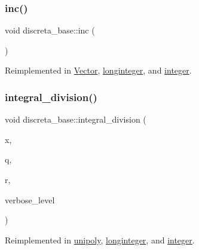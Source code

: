 \mbox{\label{classdiscreta__base_afda42789f4ba04ba399623a6b9e206e3}} 
\subsubsection{\texorpdfstring{inc()}{inc()}}
{\footnotesize\ttfamily void discreta\+\_\+base\+::inc (\begin{DoxyParamCaption}{ }\end{DoxyParamCaption})\hspace{0.3cm}{\ttfamily [virtual]}}



Reimplemented in \mbox{\hyperlink{class_vector_a5f6fe0531bc3d9829becd8503e4156a3}{Vector}}, \mbox{\hyperlink{classlonginteger_aac69c9779c9fed275a1cbae4314438e5}{longinteger}}, and \mbox{\hyperlink{classinteger_a2fd161f380ea688219131ba9a8429509}{integer}}.

\mbox{\label{classdiscreta__base_a92b3001ac35af9185b316c0d8f89070e}} 
\subsubsection{\texorpdfstring{integral\+\_\+division()}{integral\_division()}}
{\footnotesize\ttfamily void discreta\+\_\+base\+::integral\+\_\+division (\begin{DoxyParamCaption}\item[{\mbox{\hyperlink{classdiscreta__base}{discreta\+\_\+base}} \&}]{x,  }\item[{\mbox{\hyperlink{classdiscreta__base}{discreta\+\_\+base}} \&}]{q,  }\item[{\mbox{\hyperlink{classdiscreta__base}{discreta\+\_\+base}} \&}]{r,  }\item[{\mbox{\hyperlink{galois_8h_a09fddde158a3a20bd2dcadb609de11dc}{I\+NT}}}]{verbose\+\_\+level }\end{DoxyParamCaption})\hspace{0.3cm}{\ttfamily [virtual]}}



Reimplemented in \mbox{\hyperlink{classunipoly_aeb794e4d6b10709ed6be7dae9826d705}{unipoly}}, \mbox{\hyperlink{classlonginteger_a692f761cfc91770ca40ab5c2df4bd358}{longinteger}}, and \mbox{\hyperlink{classinteger_ac6b2f247cfac1e1e5708a9e035ce42fe}{integer}}.


